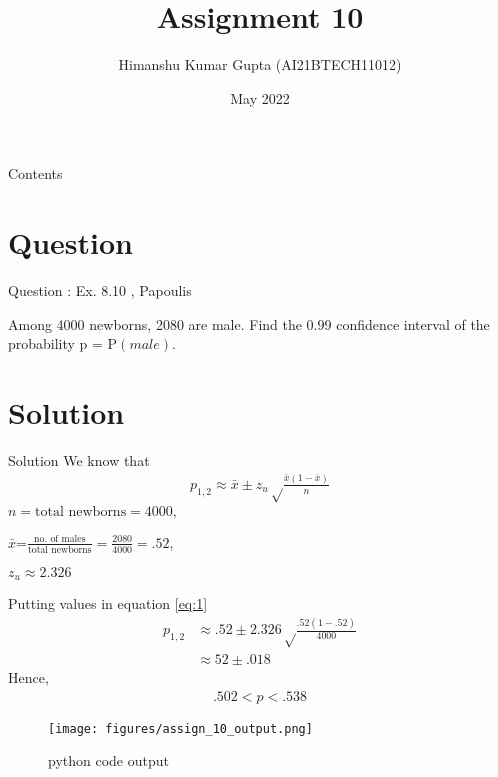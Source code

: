 \documentclass[journal,12pt,twocolumn]{beamer}
\title{Assignment 10}
\author{Himanshu Kumar Gupta (AI21BTECH11012)}
\date {May 2022}
\providecommand{\brak}[1]{\ensuremath{\left(#1\right)}}
\begin{document}
\begin{frame}
 \maketitle   
\end{frame}

\begin{frame}{Contents}
    \tableofcontents
\end{frame}

\section{Question}
\begin{frame}{Question : Ex. 8.10 , Papoulis}
\begin{block}

 Among 4000 newborns, 2080 are male. Find the 0.99 confidence interval of the probability 
p = P\brak{male}.
\end{block}
\end{frame}

\section{Solution}
\begin{frame}{Solution}
We know that 
\begin{align}
\label{eq:1}
    p_{1,2}\approx \bar{x}\pm z_u\sqrt \frac{\bar{x}\brak{1-\bar{x}}}{n}
\end{align}
$n=\text{total newborns}=4000,$

$\bar{x}$=$\frac{\text{no. of males}}{\text{total newborns}}=\frac{2080}{4000}=.52$,



$z_u\approx2.326$

 Putting values in equation \eqref{eq:1}
    \begin{align}
        p_{1,2}&\approx.52\pm2.326\sqrt\frac{.52\brak{1-.52}}{4000}\nonumber\\
&\approx52\pm.018\nonumber
    \end{align}
    Hence,
    \begin{align}
        .502<p<.538   \nonumber
    \end{align}
\end{frame}
\begin{frame}
   \begin{figure}[htb!]

\texttt{[image: figures/assign\_10\_output.png]}
\caption{python code output}
\end{figure}
\end{frame}
\end{document}
